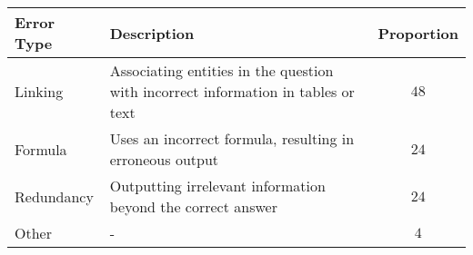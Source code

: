 \begin{tabular}{llc}
\toprule
\textbf{Error Type} & \textbf{Description} & \textbf{Proportion} \\
\midrule
Linking & Associating entities in the question with incorrect information in tables or text & $48$   \\
Formula & Uses an incorrect formula, resulting in erroneous output & $24$  \\
Redundancy & Outputting irrelevant information beyond the correct answer & $24$  \\
Other &- & $4$\\
\bottomrule
\end{tabular}